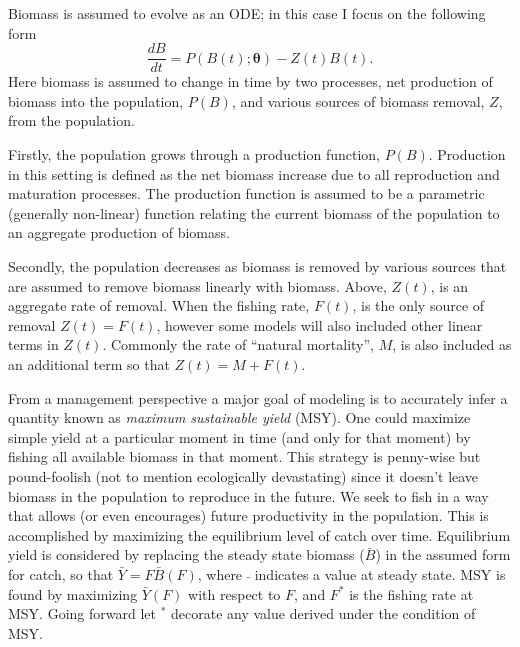 \documentclass[12pt]{ucscthesis}
\begin{document}
{%
Biomass is assumed to evolve as an ODE; in this case I focus on the following
form
%
\begin{equation}
\frac{dB}{dt} = P(B(t); \bm{\theta}) - Z(t)B(t). \label{ode}
\end{equation}
Here biomass is assumed to change in time by two processes, net production of
biomass into the population, $P(B)$, and various sources of biomass removal, $Z$, from the
population.

Firstly, the population grows through a production function, $P(B)$. Production
in this setting is defined as the net biomass increase due to all reproduction
and maturation processes.
The production function is assumed to be a parametric (generally non-linear) function
relating the current biomass of the population to an aggregate production
of biomass.

%
Secondly, the population decreases as biomass is removed by various sources that are
assumed to remove biomass linearly with biomass. Above, $Z(t)$, is an
aggregate rate of removal. When the fishing rate, $F(t)$, is the only source of removal
$Z(t)=F(t)$, however some models will also included other linear terms in $Z(t)$.
Commonly the rate of ``natural mortality'', $M$, is also included as an additional term
so that $Z(t)=M+F(t)$.

From a management perspective a major goal of modeling is to accurately infer
a quantity known as \emph{maximum sustainable yield} (MSY). One could maximize
simple yield at a particular moment in time (and only for that moment) by
fishing all available biomass in that moment. This strategy is penny-wise but
pound-foolish (not to mention ecologically devastating) since it doesn't leave
biomass in the population to reproduce in the future. We seek to fish in a way
that allows (or even encourages) future productivity in the population. This is
accomplished by maximizing the equilibrium level of catch over time.
Equilibrium yield is considered by replacing the steady state biomass ($\bar B$)
in the assumed form for catch, so that $\bar Y = F\bar B(F)$, where $\bar~$
indicates a value at steady state.
MSY is found by maximizing $\bar Y(F)$ with respect to
$F$, and $F^*$ is the fishing rate at MSY. Going forward let $^*$ decorate any
value derived under the condition of MSY.

}
\end{document}
